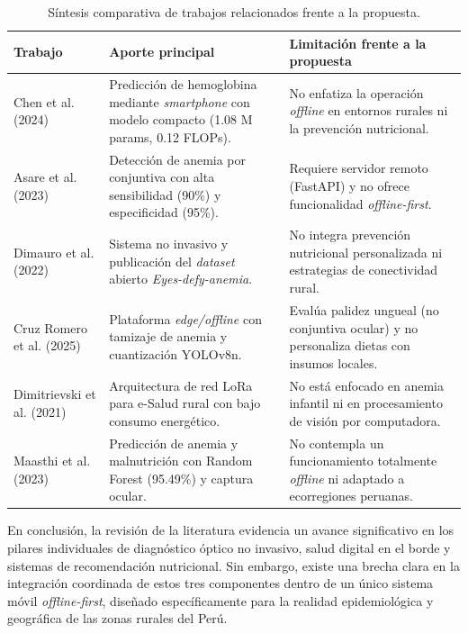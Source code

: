 \begin{table}[t]
\small
\caption{Síntesis comparativa de trabajos relacionados frente a la propuesta.}
\label{tab:sintesis_trabajos_relacionados}
\centering
\begin{tabular}{p{3.5cm} p{6.5cm} p{6.5cm}}
\hline
\textbf{Trabajo} & \textbf{Aporte principal} & \textbf{Limitación frente a la propuesta} \\
\hline
Chen et al. (2024) \cite{chen2024} & Predicción de hemoglobina mediante \textit{smartphone} con modelo compacto (1.08 M params, 0.12 FLOPs). & No enfatiza la operación \textit{offline} en entornos rurales ni la prevención nutricional. \\
\hline
Asare et al. (2023) \cite{asare2023} & Detección de anemia por conjuntiva con alta sensibilidad (90\%) y especificidad (95\%). & Requiere servidor remoto (FastAPI) y no ofrece funcionalidad \textit{offline-first}. \\
\hline
Dimauro et al. (2022) \cite{dimauro2022} & Sistema no invasivo y publicación del \textit{dataset} abierto \textit{Eyes-defy-anemia}. & No integra prevención nutricional personalizada ni estrategias de conectividad rural. \\
\hline
Cruz Romero et al. (2025) \cite{cruzromero2025} & Plataforma \textit{edge/offline} con tamizaje de anemia y cuantización YOLOv8n. & Evalúa palidez ungueal (no conjuntiva ocular) y no personaliza dietas con insumos locales. \\
\hline
Dimitrievski et al. (2021) \cite{dimitrievski2021} & Arquitectura de red LoRa para e-Salud rural con bajo consumo energético. & No está enfocado en anemia infantil ni en procesamiento de visión por computadora. \\
\hline
Maasthi et al. (2023) \cite{maasthi2023} & Predicción de anemia y malnutrición con Random Forest (95.49\%) y captura ocular. & No contempla un funcionamiento totalmente \textit{offline} ni adaptado a ecorregiones peruanas. \\
\hline
\end{tabular}
\end{table}

En conclusión, la revisión de la literatura evidencia un avance significativo en los pilares individuales de diagnóstico óptico no invasivo, salud digital en el borde y sistemas de recomendación nutricional. Sin embargo, existe una brecha clara en la integración coordinada de estos tres componentes dentro de un único sistema móvil \textit{offline-first}, diseñado específicamente para la realidad epidemiológica y geográfica de las zonas rurales del Perú.